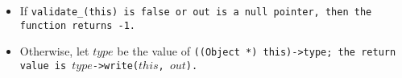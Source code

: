 \begin{itemize}[nosep]

\item If \tt{validate_(this)} is \tt{false} or \tt{out}
is a null pointer, then the function returns \tt{-1}.

\item Otherwise, let $type$ be the value of \tt{((Object *) this)->type};
the return value is $type$\tt{->write(}$this$\tt{,} $out$\tt{)}.

\end{itemize}
